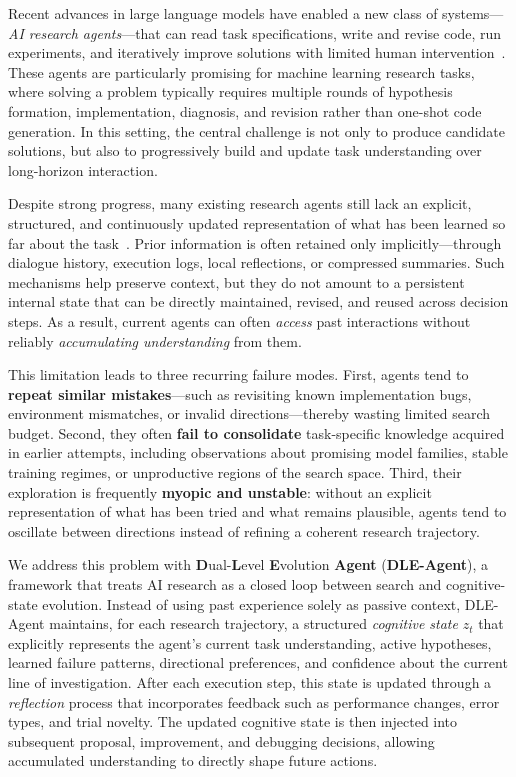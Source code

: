 \documentclass{article} %
\begin{document}
Recent advances in large language models have enabled a new class of
systems---\emph{AI research agents}---that can read task specifications, write
and revise code, run experiments, and iteratively improve solutions with
limited human intervention~\citep{huang2024mlagentbench, chan2024mlebench,
airadojo2025, airsbench2025}. These agents are particularly promising for
machine learning research tasks, where solving a problem typically requires
multiple rounds of hypothesis formation, implementation, diagnosis, and
revision rather than one-shot code generation. In this setting, the central
challenge is not only to produce candidate solutions, but also to
progressively build and update task understanding over long-horizon
interaction.

Despite strong progress, many existing research agents still lack an explicit,
structured, and continuously updated representation of what has been learned so
far about the task~\citep{shinn2023reflexion, zhao2024expel,
wang2023voyager}. Prior information is often retained only implicitly---through
dialogue history, execution logs, local reflections, or compressed
summaries. Such mechanisms help preserve context, but they do not amount to a
persistent internal state that can be directly maintained, revised, and reused
across decision steps. As a result, current agents can often \emph{access}
past interactions without reliably \emph{accumulating understanding} from them.

This limitation leads to three recurring failure modes. First, agents tend to
\textbf{repeat similar mistakes}---such as revisiting known implementation
bugs, environment mismatches, or invalid directions---thereby wasting limited
search budget. Second, they often \textbf{fail to consolidate} task-specific
knowledge acquired in earlier attempts, including observations about promising
model families, stable training regimes, or unproductive regions of the search
space. Third, their exploration is frequently \textbf{myopic and unstable}:
without an explicit representation of what has been tried and what remains
plausible, agents tend to oscillate between directions instead of refining a
coherent research trajectory.

We address this problem with \textbf{D}ual-\textbf{L}evel
\textbf{E}volution \textbf{Agent} (\textbf{DLE-Agent}), a framework that treats AI research as a
closed loop between search and cognitive-state evolution. Instead of using past
experience solely as passive context, DLE-Agent maintains, for each research
trajectory, a structured \emph{cognitive state} $z_t$ that explicitly
represents the agent's current task understanding, active hypotheses, learned
failure patterns, directional preferences, and confidence about the current
line of investigation. After each execution step, this state is updated
through a \emph{reflection} process that incorporates feedback such as
performance changes, error types, and trial novelty. The updated cognitive
state is then injected into subsequent proposal, improvement, and debugging
decisions, allowing accumulated understanding to directly shape future actions.
\end{document}
